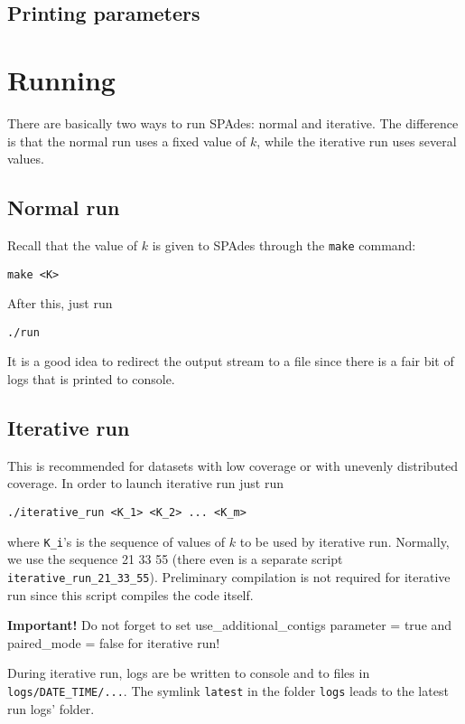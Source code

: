 \documentclass{article}
\def\spades{SPAdes}
\begin{document}
\subsection{Printing parameters}


\section{Running}
There are basically two ways to run {\spades}: normal and iterative. 
The difference is that the normal run uses a fixed value of $k$,
while the iterative run uses several values.

\subsection{Normal run}
Recall that the value of $k$ is given to {\spades} through the {\tt make} command:
\begin{lstlisting}
make <K>
\end{lstlisting}
After this, just run
\begin{lstlisting}
./run
\end{lstlisting}
It is a good idea to redirect the output stream to a file since there is a fair bit of logs that is printed to console.


\subsection{Iterative run}
This is recommended for datasets with low coverage or with unevenly distributed coverage.
In order to launch iterative run just run 
\begin{lstlisting}
./iterative_run <K_1> <K_2> ... <K_m>
\end{lstlisting}
where {\tt K\_i}'s is the sequence of values of $k$ to be used by iterative run.
Normally, we use the sequence 21 33 55 (there even is a separate script {\tt iterative\_run\_21\_33\_55}).
Preliminary compilation is not required for iterative run since this script compiles the code itself.

\textbf{Important!} Do not forget to set use\_additional\_contigs parameter = true and paired\_mode = false for iterative run!{}

During iterative run, logs are be written to console and to files in {\tt logs/DATE\_TIME/...}.
The symlink {\tt latest} in the folder {\tt logs} leads to the latest run logs' folder.
\end{document}
